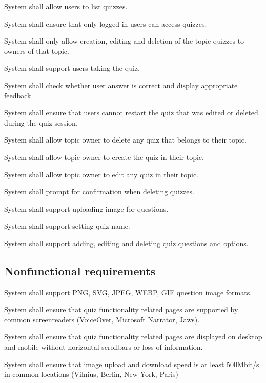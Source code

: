 \documentclass[
    english, %
]{VUMIFPSkursinis}
\begin{document}
\begin{frlist}
    \item System shall allow users to list quizzes.
    \item System shall ensure that only logged in users can access quizzes.
    \item System shall only allow creation, editing and deletion of the topic quizzes to owners of that topic.
    \item System shall support users taking the quiz.
    \item System shall check whether user answer is correct and display appropriate feedback.
    \item System shall ensure that users cannot restart the quiz that was edited or deleted during the quiz session.
    \item System shall allow topic owner to delete any quiz that belongs to their topic.
    \item System shall allow topic owner to create the quiz in their topic.
    \item System shall allow topic owner to edit any quiz in their topic.
    \item System shall prompt for confirmation when deleting quizzes.
    \item System shall support uploading image for questions.
    \item System shall support setting quiz name.
    \item System shall support adding, editing and deleting quiz questions and options.
\end{frlist}

\subsection{Nonfunctional requirements}


\begin{nfrlist}
    \item System shall support PNG, SVG, JPEG, WEBP, GIF question image formats.
    \item System shall ensure that quiz functionality related pages are supported by common screenreaders (VoiceOver, Microsoft Narrator, Jaws).
    \item System shall ensure that quiz functionality related pages are displayed on desktop and mobile without horizontal scrollbars or loss of information.
    \item System shall ensure that image upload and download speed is at least 500Mbit/s in common locations (Vilnius, Berlin, New York, Paris)
\end{nfrlist}
\end{document}
